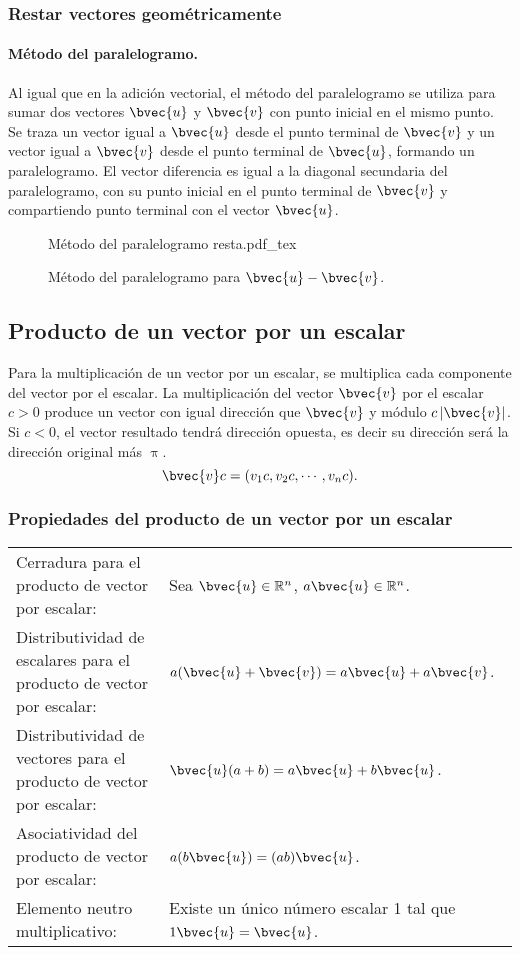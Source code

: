 \documentclass{fmbnotes}
\begin{document}
\subsubsection{Restar vectores geométricamente}

\paragraph{Método del paralelogramo.} Al igual que en la adición vectorial, el método del paralelogramo se utiliza para sumar dos vectores \( \bvec{u} \) y \( \bvec{v} \) con punto inicial en el mismo punto. Se traza un vector igual a \( \bvec{u} \) desde el punto terminal de \( \bvec{v} \) y un vector igual a \( \bvec{v} \) desde el punto terminal de \( \bvec{u} \), formando un paralelogramo. El vector diferencia es igual a la diagonal secundaria del paralelogramo, con su punto inicial en el punto terminal de \( \bvec{v} \) y compartiendo punto terminal con el vector \( \bvec{u} \).
\begin{figure}[H]
\centering
{Método del paralelogramo resta.pdf_tex}
\caption{Método del paralelogramo para \(\bvec{u}-\bvec{v}\).}
\label{fig:metodo-del-paralelogramo-resta}
\end{figure}

\subsection{Producto de un vector por un escalar}

Para la multiplicación de un vector por un escalar, se multiplica cada componente del vector por el escalar. La multiplicación del vector \( \bvec{v} \) por el escalar \( c > 0 \) produce un vector con igual dirección que \( \bvec{v} \) y módulo \(c \left| \bvec{v} \right| \). Si \( c < 0 \), el vector resultado tendrá dirección opuesta, es decir su dirección será la dirección original más \(\uppi\). 
\[\bvec{v}c=(v_1 c,v_2 c,\cdots,v_n c).\]

\subsubsection{Propiedades del producto de un vector por un escalar}

\begin{tabular}{lp{}}
	\rule[1ex]{0pt}{2.5ex} Cerradura para el producto de vector por escalar: & Sea \(\bvec{u} \in \mathbb{R}^{n}\), \(a\bvec{u} \in \mathbb{R}^{n}\).\\
	\rule[1ex]{0pt}{2.5ex} Distributividad de escalares para el producto de vector por escalar: & \(a(\bvec{u}+\bvec{v})=a\bvec{u}+a\bvec{v}\).\\
	\rule[1ex]{0pt}{2.5ex} Distributividad de vectores para el producto de vector por escalar: & \(\bvec{u}(a+b)=a\bvec{u}+b\bvec{u}\).\\
	\rule[1ex]{0pt}{2.5ex} Asociatividad del producto de vector por escalar: & \(a(b\bvec{u})=(ab)\bvec{u}\).\\
	\rule[1ex]{0pt}{2.5ex} Elemento neutro multiplicativo: & Existe un único número escalar 1 tal que \(1\bvec{u}=\bvec{u}\).\\
\end{tabular}
\end{document}
